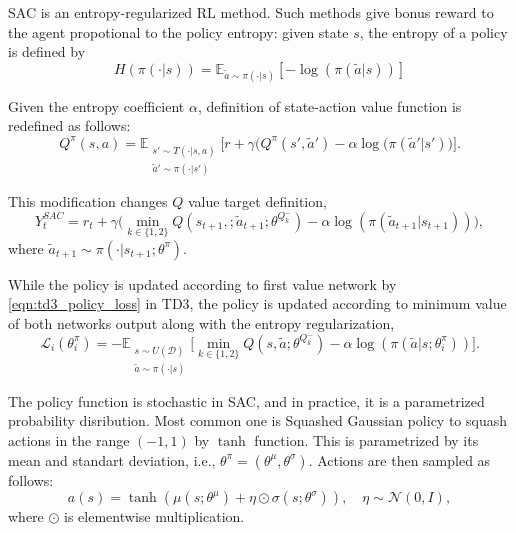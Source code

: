 \documentclass[a4paper, 12pt]{article} %
\begin{document}
SAC is an entropy-regularized RL method. Such methods give bonus reward to the agent propotional to the policy entropy: given state $s$, the entropy of a policy is defined by
\begin{equation}
\label{eqn:policy_entropy}
H(\pi(\cdot|s)) = \mathbb{E}_{\widetilde{a}\sim\pi(\cdot|s)}[-\log(\pi(\widetilde{a}|s))]
\end{equation}

Given the entropy coefficient $\alpha$, definition of state-action value function is redefined as follows: 
\begin{equation}
\label{eqn:q_dfn_entreg}
Q^{\pi}(s,a) = \mathbb{E}_{\substack{s'\sim T(\cdot|s,a)\\\widetilde{a}'\sim \pi(\cdot|s')} } \Big[r + \gamma \Big(Q^{\pi}(s',\widetilde{a}') -\alpha\log(\pi(\widetilde{a}'|s') \Big) \Big]. %
\end{equation}

This modification changes $Q$ value target definition,
\begin{equation}
\label{eqn:q_target_sac}
Y_t^{SAC} = r_t + \gamma \Big(\min_{k\in\{1,2\}} Q(s_{t+1}, ;\widetilde{a}_{t+1};\theta^{Q_k^-}) -\alpha\log(\pi(\widetilde{a}_{t+1}|s_{t+1})) \Big),
\end{equation}
where $\widetilde{a}_{t+1} \sim \pi(\cdot|s_{t+1}; \theta^{\pi})$.

While the policy is updated according to first value network by \eqref{eqn:td3_policy_loss} in TD3, the policy is updated according to minimum value of both networks output along with the entropy regularization, 
\begin{equation}
\label{eqn:sac_policy_loss}
\mathcal{L}_i(\theta^\pi_i) = - \mathbb{E}_{\substack{s \sim U(\mathcal{D})\\\widetilde{a} \sim \pi(\cdot|s)}} \Big[ \min_{k\in\{1,2\}} Q(s, \widetilde{a};\theta^{Q_k^-}) - \alpha\log(\pi(\widetilde{a}|s;\theta^\pi_i)) \Big].
\end{equation}

The policy function is stochastic in SAC, and in practice, it is a parametrized probability disribution. Most common one is 
Squashed Gaussian policy to squash actions in the range $(-1,1)$ by $\tanh$ function. 
This is parametrized by its mean and standart deviation, i.e., $\theta^{\pi}=(\theta^{\mu}, \theta^{\sigma})$. Actions are then sampled as follows: 
\begin{equation}
\label{eqn:squashed_gp_sampling}
a(s) = \tanh(\mu(s; \theta^{\mu}) + \eta \odot \sigma(s; \theta^{\sigma})), \quad \eta \sim \mathcal{N}(0, I), 
\end{equation}
where $\odot$ is elementwise multiplication.
\end{document}
